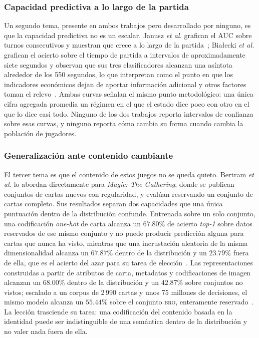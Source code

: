 \documentclass[conference]{IEEEtran}
\begin{document}
\subsubsection{Capacidad predictiva a lo largo de la partida}
Un segundo tema, presente en ambos trabajos pero desarrollado por ninguno,
es que la capacidad predictiva no es un escalar. Janusz \textit{et al.}
grafican el AUC sobre turnos consecutivos y muestran que crece a lo largo
de la partida~\cite{janusz_hearthstone_2017}; Bia\l ecki \textit{et al.}
grafican el acierto sobre el tiempo de partida a intervalos de
aproximadamente siete segundos y observan que sus tres clasificadores
alcanzan una as\'intota alrededor de los 550 segundos, lo que interpretan
como el punto en que los indicadores econ\'omicos dejan de aportar
informaci\'on adicional y otros factores toman el
relevo~\cite{bialecki_sc2egset_2023}. Ambas curvas se\~nalan el mismo punto
metodol\'ogico: una \'unica cifra agregada promedia un r\'egimen en el que
el estado dice poco con otro en el que lo dice casi todo. Ninguno de los dos
trabajos reporta intervalos de confianza sobre esas curvas, y ninguno
reporta c\'omo cambia su forma cuando cambia la poblaci\'on de jugadores.

\subsubsection{Generalizaci\'on ante contenido cambiante}
El tercer tema es que el contenido de estos juegos no se queda quieto.
Bertram \textit{et al.} lo abordan directamente para \emph{Magic: The
Gathering}, donde se publican conjuntos de cartas nuevos con regularidad, y
eval\'uan reservando un conjunto de cartas completo. Sus resultados separan
dos capacidades que una \'unica puntuaci\'on dentro de la distribuci\'on
confunde. Entrenada sobre un solo conjunto, una codificaci\'on
\emph{one-hot} de carta alcanza un $67.80\%$ de acierto \emph{top-1}
sobre datos reservados de ese mismo conjunto y no puede producir
predicci\'on alguna para cartas que nunca ha visto, mientras que una
incrustaci\'on aleatoria de la misma dimensionalidad alcanza un
$67.87\%$ dentro de la distribuci\'on y un $23.79\%$ fuera de ella, que
es el acierto del azar para su tarea de
elecci\'on~\cite{bertram_cardrepresentations_2024}. Las representaciones
construidas a partir de atributos de carta, metadatos y codificaciones de
imagen alcanzan un $68.00\%$ dentro de la distribuci\'on y un
$42.87\%$ sobre conjuntos no vistos; escalado a un corpus de 2\,990
cartas y unos 75 millones de decisiones, el mismo modelo alcanza un
$55.44\%$ sobre el conjunto \textsc{bro}, enteramente
reservado~\cite{bertram_cardrepresentations_2024}. La lecci\'on trasciende
su tarea: una codificaci\'on del contenido basada en la identidad puede ser
indistinguible de una sem\'antica dentro de la distribuci\'on y no valer
nada fuera de ella.
\end{document}
